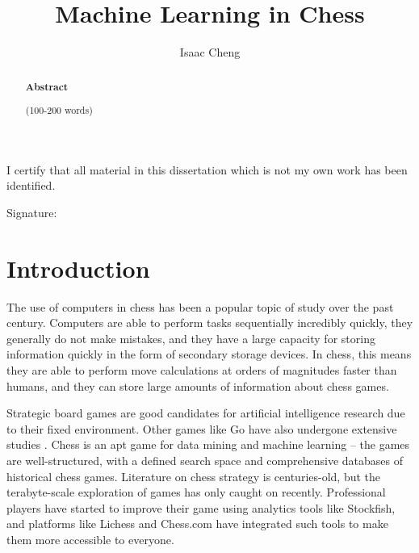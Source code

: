 \documentclass[%
 superscriptaddress,
showpacs,preprintnumbers,
 amsmath,
 amssymb,
 aps,
 pra,
showkeys,
onecolumn,
notitlepage,
11pt,
tightenlines      %
]{revtex4-1}
\begin{document}
\title{\Large Machine Learning in Chess}

\author{Isaac Cheng}

\begin{abstract}
\noindent \textbf{Abstract}

\noindent 
(100-200 words)

\end{abstract}

\maketitle

\vspace*{\fill}


\begin{center}
I certify that all material in this dissertation which is not my own work has been identified.
\end{center}
\vspace{1em}

Signature: \hrulefill


\newpage
\section{Introduction}
The use of computers in chess has been a popular topic of study over the past century. Computers are able to perform tasks sequentially incredibly quickly, they generally do not make mistakes, and they have a large capacity for storing information quickly in the form of secondary storage devices. In chess, this means they are able to perform move calculations at orders of magnitudes faster than humans, and they can store large amounts of information about chess games.

Strategic board games are good candidates for artificial intelligence research due to their fixed environment. Other games like Go have also undergone extensive studies \cite{muller2002computer}. Chess is an apt game for data mining and machine learning -- the games are well-structured, with a defined search space and comprehensive databases of historical chess games. Literature on chess strategy is centuries-old, but the terabyte-scale exploration of games has only caught on recently. Professional players have started to improve their game using analytics tools like Stockfish, and platforms like Lichess and Chess.com have integrated such tools to make them more accessible to everyone.
\end{document}
